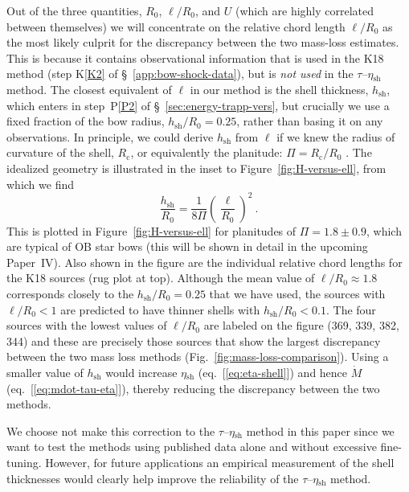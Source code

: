 \documentclass[useAMS, usenatbib, a4paper]{mnras}
\newcommand\shell{\ensuremath{_{\text{sh}}}}
\begin{document}

Out of the three quantities, \(R_0\), \(\ell/R_0\), and \(U\) (which
are highly correlated between themselves) we will concentrate on the
relative chord length \(\ell/R_0\) as the most likely culprit for the
discrepancy between the two mass-loss estimates.  This is because it
contains observational information that is used in the K18 method
(step K\ref{K2} of \S~\ref{app:bow-shock-data}), but is \textit{not
  used} in the \(\tau\)--\(\eta\shell\) method.  The closest
equivalent of \(\ell\) in our method is the shell thickness,
\(h\shell\), which enters in step~P\ref{P2} of
\S~\ref{sec:energy-trapp-vers}, but crucially we use a fixed fraction
of the bow radius, \(h\shell / R_0 = 0.25\), rather than basing it on
any observations.  In principle, we could derive \(h\shell\) from
\(\ell\) if we knew the radius of curvature of the shell,
\(R_{\text{c}}\), or equivalently the planitude:
\(\Pi = R_{\text{c}} / R_0\) \citep{Tarango-Yong:2018a}.  The idealized
geometry is illustrated in the inset to Figure~\ref{fig:H-versus-ell},
from which we find
\begin{equation}
  \label{eq:h-R0}
  \frac{h\shell}{R_0} = \frac{1}{8\Pi} \left(\frac{\ell}{R_0}\right)^2 \ .
\end{equation}
This is plotted in Figure~\ref{fig:H-versus-ell} for planitudes of
\(\Pi = 1.8 \pm 0.9\), which are typical of OB star bows (this will be
shown in detail in the upcoming Paper~IV).  Also shown in the figure
are the individual relative chord lengths for the K18 sources (rug
plot at top).  Although the mean value of \(\ell/R_0 \approx 1.8\)
corresponds closely to the \(h\shell/R_0 = 0.25\) that we have used,
the sources with \(\ell/R_0 < 1\) are predicted to have thinner shells
with \(h\shell/R_0 < 0.1\).  The four sources with the lowest values
of \(\ell/R_0\) are labeled on the figure (369, 339, 382, 344) and
these are precisely those sources that show the largest discrepancy
between the two mass loss methods
(Fig.~\ref{fig:mass-loss-comparison}).  Using a smaller value of
\(h\shell\) would increase \(\eta\shell\) (eq.~[\ref{eq:eta-shell}])
and hence \(\dot{M}\) (eq.~[\ref{eq:mdot-tau-eta}]), thereby reducing
the discrepancy between the two methods.

We choose not make this correction to the \(\tau\)--\(\eta\shell\)
method in this paper since we want to test the methods using published
data alone and without excessive fine-tuning.  However, for future
applications an empirical measurement of the shell thicknesses would
clearly help improve the reliability of the \(\tau\)--\(\eta\shell\)
method.
\end{document}
